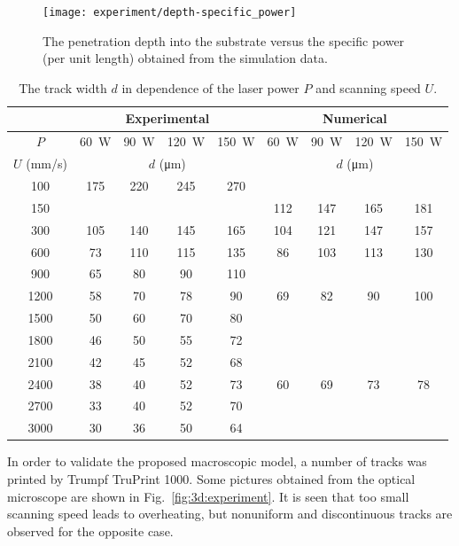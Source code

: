 \documentclass{article}
\begin{document}
\begin{figure}
    \centering
    \texttt{[image: experiment/depth-specific\_power]}
    \caption{
        The penetration depth into the substrate versus the specific power (per unit length) obtained from the simulation data.
    }\label{fig:3d:depth}
\end{figure}

\begin{table}
    \centering
    \caption{
        The track width \(d\) in dependence of the laser power \(P\) and scanning speed \(U\).
    }\label{table:3d:width}
    \centering
    \begin{tabular}{|c|cccc|cccc|}\hline
        & \multicolumn{4}{c|}{Experimental} & \multicolumn{4}{c|}{Numerical} \\\hline
        \(P\) & \SI{60}{W} & \SI{90}{W} & \SI{120}{W} & \SI{150}{W} & \SI{60}{W} & \SI{90}{W} & \SI{120}{W} & \SI{150}{W} \\\hline
        \(U\) (\si{mm/s}) & \multicolumn{4}{c|}{\(d\) (\si{\um})} & \multicolumn{4}{c|}{\(d\) (\si{\um})} \\\hline
        100  & 175 & 220 & 245 & 270 &     &     &     &     \\
        150  &     &     &     &     & 112 & 147 & 165 & 181 \\
        300  & 105 & 140 & 145 & 165 & 104 & 121 & 147 & 157 \\
        600  & 73  & 110 & 115 & 135 & 86  & 103 & 113 & 130 \\
        900  & 65  & 80  & 90  & 110 &     &     &     &     \\
        1200 & 58  & 70  & 78  & 90  & 69  & 82  & 90  & 100 \\
        1500 & 50  & 60  & 70  & 80  &     &     &     &     \\
        1800 & 46  & 50  & 55  & 72  &     &     &     &     \\
        2100 & 42  & 45  & 52  & 68  &     &     &     &     \\
        2400 & 38  & 40  & 52  & 73  & 60  & 69  & 73  & 78  \\
        2700 & 33  & 40  & 52  & 70  &     &     &     &     \\
        3000 & 30  & 36  & 50  & 64  &     &     &     &     \\\hline
    \end{tabular}
\end{table}

In order to validate the proposed macroscopic model, a number of tracks was printed by Trumpf TruPrint 1000.
Some pictures obtained from the optical microscope are shown in Fig.~\ref{fig:3d:experiment}.
It is seen that too small scanning speed leads to overheating,
but nonuniform and discontinuous tracks are observed for the opposite case.
\end{document}
